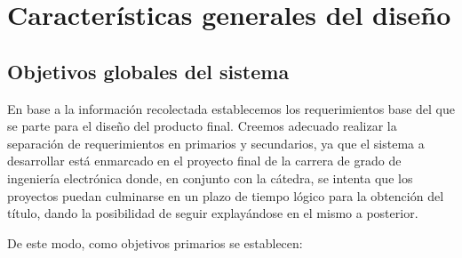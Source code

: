 \chapter{Características generales del diseño}
\section{Objetivos globales del sistema}

En base a la información recolectada establecemos los requerimientos base del que se parte para el diseño del producto final. Creemos adecuado
realizar la separación de requerimientos en primarios y secundarios, ya que el sistema a desarrollar está enmarcado en el proyecto final de la 
carrera de grado de ingeniería electrónica donde, en conjunto con la cátedra, se intenta que los proyectos puedan culminarse en un plazo de 
tiempo lógico para la obtención del título, dando la posibilidad de seguir explayándose en el mismo a posterior. \par

De este modo, como objetivos primarios se establecen:

